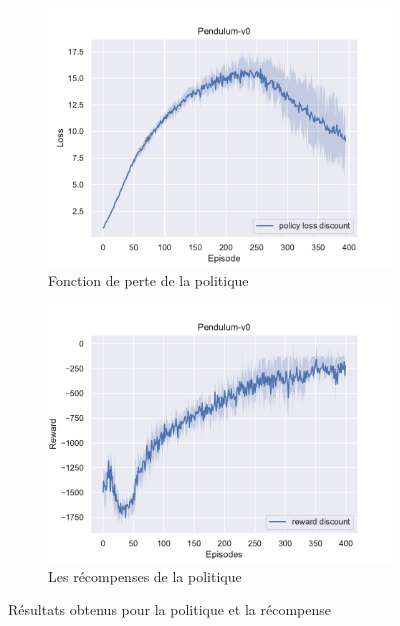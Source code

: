 \begin{figure}[H]
    \centering
    \begin{subfigure}{0.45\textwidth}
        \includegraphics[width=\textwidth]{figures/sac_itr3/policy_loss_Pendulum-v0_pg_dataset_td_trajs_400_update_threshold_1000_nb_updates_20_gamma_0.98_tau_0.01_nstep_5_lr_act_0.0005_lr_critic_0.001_init_alpha_0.02_lr_alpha_0.0_target_entropy_alpha_-1.0pg.pdf}
        \caption{Fonction de perte de la politique}
    \end{subfigure}
    \begin{subfigure}{0.45\textwidth}
        \includegraphics[width=\textwidth]{figures/sac_itr3/rewards_Pendulum-v0_pg_dataset_td_trajs_400_update_threshold_1000_nb_updates_20_gamma_0.98_tau_0.01_nstep_5_lr_act_0.0005_lr_critic_0.001_init_alpha_0.02_lr_alpha_0.0_target_entropy_alpha_-1.0.pdf}
        \caption{Les récompenses de la politique}
    \end{subfigure}
    \caption{Résultats obtenus pour la politique et la récompense}
    \label{fig:sac:results3}
\end{figure}

